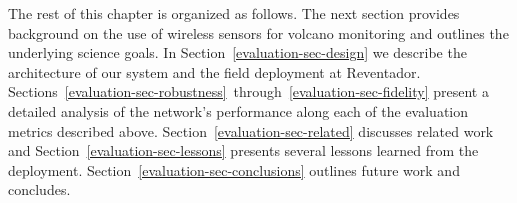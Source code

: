 The rest of this chapter is organized as follows. The next section provides
background on the use of wireless sensors for volcano monitoring and outlines
the underlying science goals. In Section~\ref{evaluation-sec-design} we
describe the architecture of our system and the field deployment at
Reventador.
Sections~\ref{evaluation-sec-robustness}~through~\ref{evaluation-sec-fidelity}
present a detailed analysis of the network's performance along each of the
evaluation metrics described above. Section~\ref{evaluation-sec-related}
discusses related work and Section~\ref{evaluation-sec-lessons} presents
several lessons learned from the deployment.
Section~\ref{evaluation-sec-conclusions} outlines future work and concludes.

